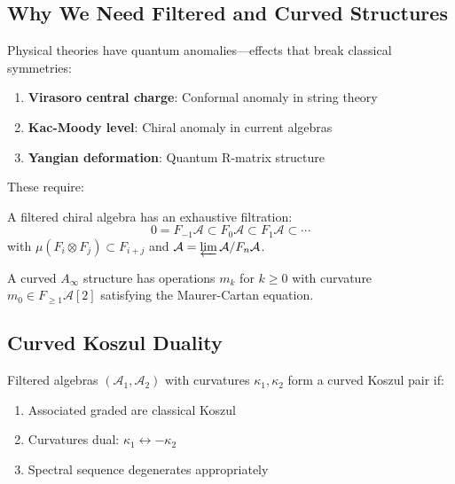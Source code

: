 \subsection{Why We Need Filtered and Curved Structures}

Physical theories have quantum anomalies—effects that break classical symmetries:

\begin{example}
\begin{enumerate}
\item \textbf{Virasoro central charge}: Conformal anomaly in string theory
\item \textbf{Kac-Moody level}: Chiral anomaly in current algebras  
\item \textbf{Yangian deformation}: Quantum R-matrix structure
\end{enumerate}
\end{example}

These require:

\begin{definition}
A filtered chiral algebra has an exhaustive filtration:
$$0 = F_{-1}\mathcal{A} \subset F_0\mathcal{A} \subset F_1\mathcal{A} \subset \cdots$$
with $\mu(F_i \otimes F_j) \subset F_{i+j}$ and $\mathcal{A} = \varprojlim \mathcal{A}/F_n\mathcal{A}$.
\end{definition}

\begin{definition}
A curved $A_\infty$ structure has operations $m_k$ for $k \geq 0$ with curvature $m_0 \in F_{\geq 1}\mathcal{A}[2]$ satisfying the Maurer-Cartan equation.
\end{definition}

\subsection{Curved Koszul Duality}

\begin{theorem}
Filtered algebras $(\mathcal{A}_1, \mathcal{A}_2)$ with curvatures $\kappa_1, \kappa_2$ form a curved Koszul pair if:
\begin{enumerate}
\item Associated graded are classical Koszul
\item Curvatures dual: $\kappa_1 \leftrightarrow -\kappa_2$
\item Spectral sequence degenerates appropriately
\end{enumerate}
\end{theorem}

